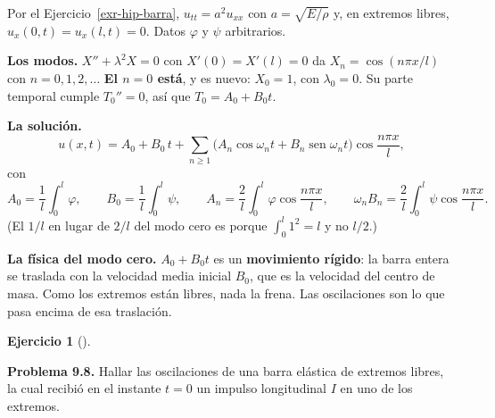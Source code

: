 \documentclass[
  spanish,
  a4paper,
]{scrbook}
\theoremstyle{definition}
\theoremstyle{plain}
\theoremstyle{definition}
\theoremstyle{plain}
\theoremstyle{definition}
\newtheorem{exercise}{Ejercicio}[chapter]
\theoremstyle{remark}
\begin{document}
\begin{tcolorbox}[enhanced jigsaw, arc=.35mm, bottomrule=.15mm, bottomtitle=1mm, breakable, colback=white, colbacktitle=quarto-callout-tip-color!10!white, colframe=quarto-callout-tip-color-frame, coltitle=black, left=2mm, leftrule=.75mm, opacityback=0, opacitybacktitle=0.6, rightrule=.15mm, title=\textcolor{quarto-callout-tip-color}{\faLightbulb}\hspace{0.5em}{Solución}, titlerule=0mm, toprule=.15mm, toptitle=1mm]

Por el Ejercicio~\ref{exr-hip-barra}, \(u_{tt} = a^2u_{xx}\) con
\(a = \sqrt{E/\rho}\) y, en extremos libres,
\(u_x(0,t) = u_x(l,t) = 0\). Datos \(\varphi\) y \(\psi\) arbitrarios.

\textbf{Los modos.} \(X'' + \lambda^2X = 0\) con \(X'(0) = X'(l) = 0\)
da \(X_n = \cos(n\pi x/l)\) con \(n = 0, 1, 2,\dots\) \textbf{El
\(n = 0\) está}, y es nuevo: \(X_0 = 1\), con \(\lambda_0 = 0\). Su
parte temporal cumple \(T_0'' = 0\), así que \(T_0 = A_0 + B_0t\).

\textbf{La solución.} \[
u(x,t) = A_0 + B_0\,t + \sum_{n\ge1}\big(A_n\cos\omega_nt + B_n\operatorname{sen}\omega_nt\big)\cos\frac{n\pi x}{l},
\] con \[
A_0 = \frac1l\int_0^l\varphi,\qquad B_0 = \frac1l\int_0^l\psi,\qquad
A_n = \frac2l\int_0^l\varphi\cos\frac{n\pi x}{l},\qquad \omega_nB_n = \frac2l\int_0^l\psi\cos\frac{n\pi x}{l}.
\] (El \(1/l\) en lugar de \(2/l\) del modo cero es porque
\(\int_0^l1^2 = l\) y no \(l/2\).)

\textbf{La física del modo cero.} \(A_0 + B_0t\) es un
\textbf{movimiento rígido}: la barra entera se traslada con la velocidad
media inicial \(B_0\), que es la velocidad del centro de masa. Como los
extremos están libres, nada la frena. Las oscilaciones son lo que pasa
encima de esa traslación.

\end{tcolorbox}

\begin{exercise}[]\protect\hypertarget{exr-hip-p8}{}\label{exr-hip-p8}

\textbf{Problema 9.8.} Hallar las oscilaciones de una barra elástica de
extremos libres, la cual recibió en el instante \(t = 0\) un impulso
longitudinal \(I\) en uno de los extremos.

\end{exercise}
\end{document}
